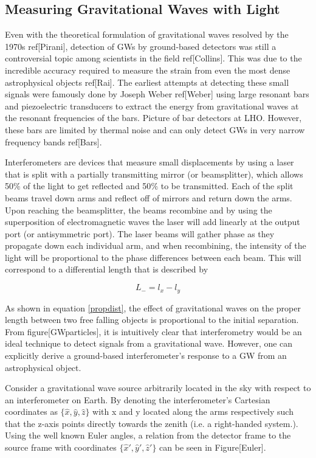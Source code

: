 	\cite{Saulson}
	
	\subsection{Measuring Gravitational Waves with Light}\label{measuringGWs}
	Even with the theoretical formulation of gravitational waves resolved by the 1970s ref[Pirani], detection of GWs by ground-based detectors was still a controversial topic among scientists in the field ref[Collins].  This was due to the incredible accuracy required to measure the strain from even the most dense astrophysical objects ref[Rai].  The earliest attempts at detecting these small signals were famously done by Joseph Weber ref[Weber] using large resonant bars and piezoelectric transducers to extract the energy from gravitational waves at the resonant frequencies of the bars. Picture of bar detectors at LHO.  However, these bars are limited by thermal noise and can only detect GWs in very narrow frequency bands ref[Bars]. 
	
	Interferometers are devices that measure small displacements by using a laser that is split with a partially transmitting mirror (or beamsplitter), which allows 50$\%$ of the light to get reflected and 50$\%$ to be transmitted.  Each of the split beams travel down arms and reflect off of mirrors and return down the arms.  Upon reaching the beamsplitter, the beams recombine and by using the superposition of electromagnetic waves the laser will add linearly at the output port (or antisymmetric port).  The laser beams will gather phase as they propagate down each individual arm, and when recombining, the intensity of the light will be proportional to the phase differences between each beam.  This will correspond to a differential length that is described by
	
	\begin{equation}
	L_{-} = l_{x} - l_{y}
	\end{equation}
	
	As shown in equation \ref{propdist}, the effect of gravitational waves on the proper length between two free falling objects is proportional to the initial separation.  From figure[GWparticles], it is intuitively clear that interferometry would be an ideal technique to detect signals from a gravitational wave.  However, one can explicitly derive a ground-based interferometer's response to a GW from an astrophysical object.
	
	Consider a gravitational wave source arbitrarily located in the sky with respect to an interferometer on Earth. By denoting the interferometer's Cartesian coordinates as $\{\hat{x},\hat{y},\hat{z}\}$ with x and y located along the arms respectively such that the z-axis points directly towards the zenith (i.e. a right-handed system.).  Using the well known Euler angles, a relation from the detector frame to the source frame with coordinates $\{\hat{x}',\hat{y}',\hat{z}'\}$ can be seen in Figure[Euler]. 
	
